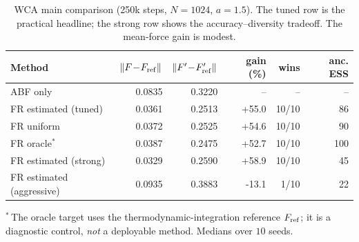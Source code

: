 \begin{table}[t]
\centering
\small
\caption{WCA main comparison (250k steps, $N=1024$, $a=1.5$). The tuned row is the practical headline; the strong row shows the accuracy--diversity tradeoff. The mean-force gain is modest.}
\label{tab:wca_main}
\begin{tabular}{lrrrrr}
\toprule
Method & $\|F\!-\!F_{\rm ref}\|$ & $\|F'\!-\!F'_{\rm ref}\|$ & gain (\%) & wins & anc. ESS \\
\midrule
ABF only & 0.0835 & 0.3220 & -- & -- & -- \\
FR estimated (tuned) & 0.0361 & 0.2513 & +55.0 & 10/10 & 86 \\
FR uniform & 0.0372 & 0.2525 & +54.6 & 10/10 & 90 \\
FR oracle$^{*}$ & 0.0387 & 0.2475 & +52.7 & 10/10 & 100 \\
FR estimated (strong) & 0.0329 & 0.2590 & +58.9 & 10/10 & 45 \\
FR estimated (aggressive) & 0.0935 & 0.3883 & -13.1 & 1/10 & 22 \\
\bottomrule
\end{tabular}
\par\smallskip\footnotesize $^{*}$\,The oracle target uses the thermodynamic-integration reference $F_{\rm ref}$; it is a diagnostic control, \emph{not} a deployable method. Medians over $10$ seeds.
\end{table}
